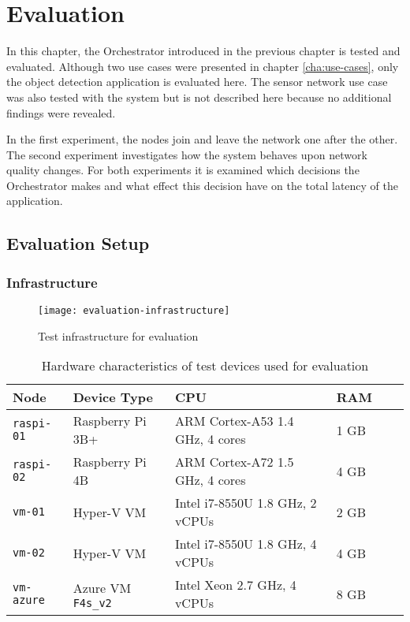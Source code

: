 \chapter{Evaluation\label{cha:evaluation}}

In this chapter, the Orchestrator introduced in the previous chapter is tested and evaluated.
Although two use cases were presented in chapter \ref{cha:use-cases}, only the object detection application is evaluated here.
The sensor network use case was also tested with the system but is not described here because no additional findings were revealed.

In the first experiment, the nodes join and leave the network one after the other.
The second experiment investigates how the system behaves upon network quality changes.
For both experiments it is examined which decisions the Orchestrator makes and what effect this decision have on the total latency of the application.





\section{Evaluation Setup}

\subsection{Infrastructure\label{sec:eval-infrastructure}}

\begin{figure}[htb]
    \centering
    \texttt{[image: evaluation-infrastructure]}
    \caption{Test infrastructure for evaluation}
    \label{fig:evaluation-infrastructure}
\end{figure}

\begin{table}[htb]
    \centering
    \begin{tabular}{|l|l|l|l|l|l|}
    \hline
        \textbf{Node} & \textbf{Device Type} & \textbf{CPU} & \textbf{RAM} \\
         \hline
         \texttt{raspi-01} & Raspberry Pi 3B+ & ARM Cortex-A53 1.4 GHz, 4 cores & 1 GB\\
         \hline
         \texttt{raspi-02} & Raspberry Pi 4B & ARM Cortex-A72 1.5 GHz, 4 cores & 4 GB\\
         \hline
         \texttt{vm-01} & Hyper-V VM & Intel i7-8550U 1.8 GHz, 2 vCPUs & 2 GB\\
         \hline
         \texttt{vm-02} & Hyper-V VM & Intel i7-8550U 1.8 GHz, 4 vCPUs & 4 GB\\
         \hline
         \texttt{vm-azure} & Azure VM \texttt{F4s\_v2} & Intel Xeon 2.7 GHz, 4 vCPUs & 8 GB\\
         \hline
    \end{tabular}
    \caption{Hardware characteristics of test devices used for evaluation}
    \label{tab:evaluation-devices}
\end{table}

